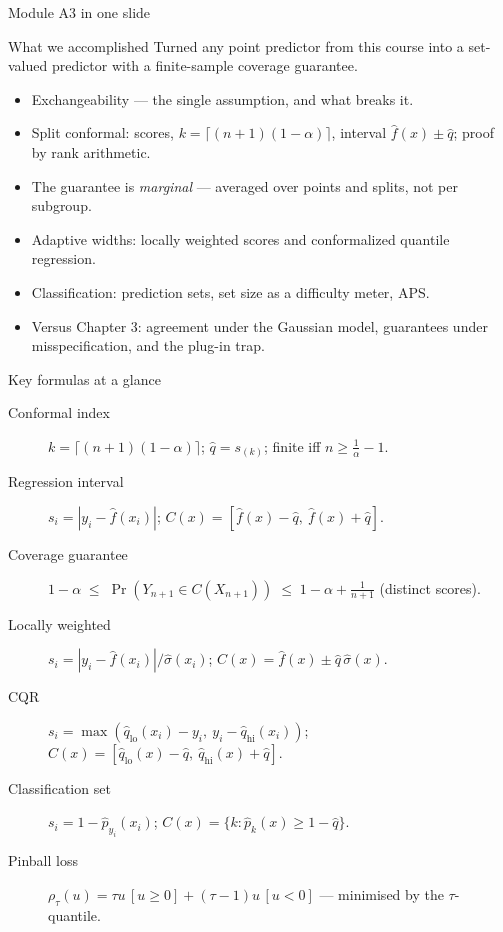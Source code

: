 \documentclass[aspectratio=169,11pt]{beamer}
\begin{document}
\begin{frame}{Module A3 in one slide}
  \begin{block}{What we accomplished}
    Turned any point predictor from this course into a set-valued predictor with a
    finite-sample coverage guarantee.
  \end{block}
  \begin{itemize}
    \item Exchangeability --- the single assumption, and what breaks it.
    \item Split conformal: scores, $k = \lceil (n+1)(1-\alpha) \rceil$, interval
          $\hat f(x) \pm \hat q$; proof by rank arithmetic.
    \item The guarantee is \emph{marginal} --- averaged over points and splits, not
          per subgroup.
    \item Adaptive widths: locally weighted scores and conformalized quantile
          regression.
    \item Classification: prediction sets, set size as a difficulty meter, APS.
    \item Versus Chapter 3: agreement under the Gaussian model, guarantees under
          misspecification, and the plug-in trap.
  \end{itemize}
\end{frame}

\begin{frame}{Key formulas at a glance}
  \footnotesize
  \begin{description}
    \item[Conformal index] $k = \lceil (n+1)(1-\alpha) \rceil$; \quad
      $\hat q = s_{(k)}$; \quad finite iff $n \ge \tfrac{1}{\alpha} - 1$.
    \item[Regression interval] $s_i = |y_i - \hat f(x_i)|$; \quad
      $C(x) = [\hat f(x) - \hat q,\ \hat f(x) + \hat q]$.
    \item[Coverage guarantee] $1 - \alpha \;\le\; \Pr(Y_{n+1} \in C(X_{n+1}))
      \;\le\; 1 - \alpha + \tfrac{1}{n+1}$ (distinct scores).
    \item[Locally weighted] $s_i = |y_i - \hat f(x_i)| / \hat\sigma(x_i)$; \quad
      $C(x) = \hat f(x) \pm \hat q\,\hat\sigma(x)$.
    \item[CQR] $s_i = \max(\hat q_{\text{lo}}(x_i) - y_i,\ y_i - \hat q_{\text{hi}}(x_i))$;
      \quad $C(x) = [\hat q_{\text{lo}}(x) - \hat q,\ \hat q_{\text{hi}}(x) + \hat q]$.
    \item[Classification set] $s_i = 1 - \hat p_{y_i}(x_i)$; \quad
      $C(x) = \{k : \hat p_k(x) \ge 1 - \hat q\}$.
    \item[Pinball loss] $\rho_\tau(u) = \tau u \,[u \ge 0] + (\tau - 1) u\, [u < 0]$
      --- minimised by the $\tau$-quantile.
  \end{description}
\end{frame}
\end{document}
